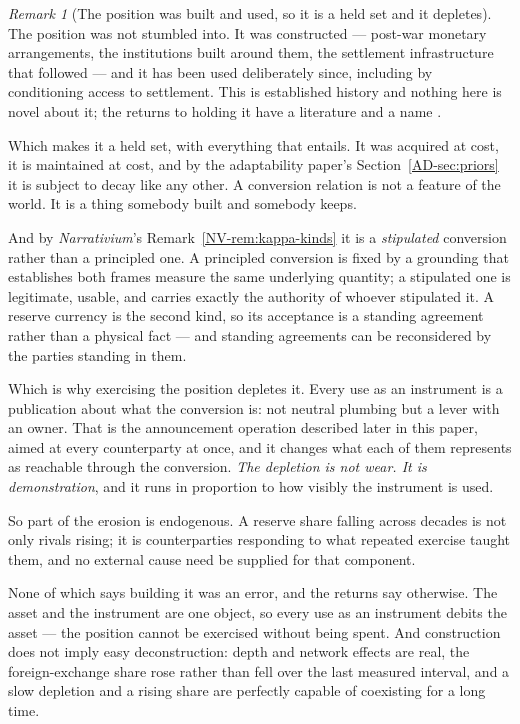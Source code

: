 \documentclass[11pt,a4paper]{article}
\theoremstyle{remark}
\newtheorem{remark}[definition]{Remark}
\begin{document}
\begin{remark}[The position was built and used, so it is a held set and it depletes]\label{rem:built}
The position was not stumbled into. It was constructed --- post-war monetary arrangements, the
institutions built around them, the settlement infrastructure that followed --- and it has been used
deliberately since, including by conditioning access to settlement. This is established history
and nothing here is novel about it; the returns to holding it have a literature and a name
\citep{eichengreen2011}.

Which makes it a held set, with everything that entails. It was acquired at cost, it is
maintained at cost, and by the adaptability paper's Section~\ref{AD-sec:priors} it is subject to decay like any other. A
conversion relation is not a feature of the world. It is a thing somebody built and somebody
keeps.

And by \emph{Narrativium}'s Remark~\ref{NV-rem:kappa-kinds} it is a \emph{stipulated} conversion
rather than a principled one. A principled conversion is fixed by a grounding that establishes both frames measure
the same underlying quantity; a stipulated one is legitimate, usable, and carries exactly the authority
of whoever stipulated it. A reserve currency is the second kind, so its acceptance is a standing
agreement rather than a physical fact --- and standing agreements can be reconsidered by the parties
standing in them.

Which is why exercising the position depletes it. Every use as an instrument is a publication
about what the conversion is: not neutral plumbing but a lever with an owner. That is the
announcement operation described later in this paper, aimed at every counterparty at once, and it
changes what each of them represents as reachable through the conversion. \emph{The depletion is not
wear. It is demonstration}, and it runs in proportion to how visibly the instrument is used.

So part of the erosion is endogenous. A reserve share falling across decades is not only rivals
rising; it is counterparties responding to what repeated exercise taught them, and no external
cause need be supplied for that component.

None of which says building it was an error, and the returns say otherwise. The asset and
the instrument are one object, so every use as an instrument debits the asset --- the position
cannot be exercised without being spent. And construction does not imply easy deconstruction: depth and
network effects are real, the foreign-exchange share rose rather than fell over the last measured
interval, and a slow depletion and a rising share are perfectly capable of coexisting for a long time.
\end{remark}
\end{document}
